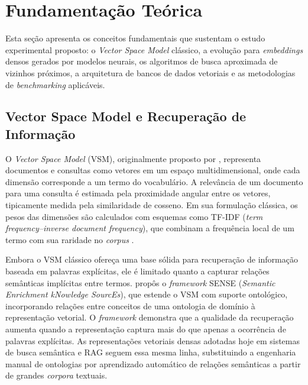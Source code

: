 
\section{Fundamentação Teórica}

Esta seção apresenta os conceitos fundamentais que sustentam o estudo experimental proposto: o \textit{Vector Space Model} clássico, a evolução para \textit{embeddings} densos gerados por modelos neurais, os algoritmos de busca aproximada de vizinhos próximos, a arquitetura de bancos de dados vetoriais e as metodologias de \textit{benchmarking} aplicáveis.

\subsection{Vector Space Model e Recuperação de Informação}

O \textit{Vector Space Model} (VSM), originalmente proposto por , representa documentos e consultas como vetores em um espaço multidimensional, onde cada dimensão corresponde a um termo do vocabulário. A relevância de um documento para uma consulta é estimada pela proximidade angular entre os vetores, tipicamente medida pela similaridade de cosseno. Em sua formulação clássica, os pesos das dimensões são calculados com esquemas como TF-IDF (\textit{term frequency--inverse document frequency}), que combinam a frequência local de um termo com sua raridade no \textit{corpus} \cite{paiva2014semrelext}.

Embora o VSM clássico ofereça uma base sólida para recuperação de informação baseada em palavras explícitas, ele é limitado quanto a capturar relações semânticas implícitas entre termos.  propôs o \textit{framework} SENSE (\textit{Semantic Enrichment kNowledge SourcEs}), que estende o VSM com suporte ontológico, incorporando relações entre conceitos de uma ontologia de domínio à representação vetorial. O \textit{framework} demonstra que a qualidade da recuperação aumenta quando a representação captura mais do que apenas a ocorrência de palavras explícitas. As representações vetoriais densas adotadas hoje em sistemas de busca semântica e RAG seguem essa mesma linha, substituindo a engenharia manual de ontologias por aprendizado automático de relações semânticas a partir de grandes \textit{corpora} textuais.

